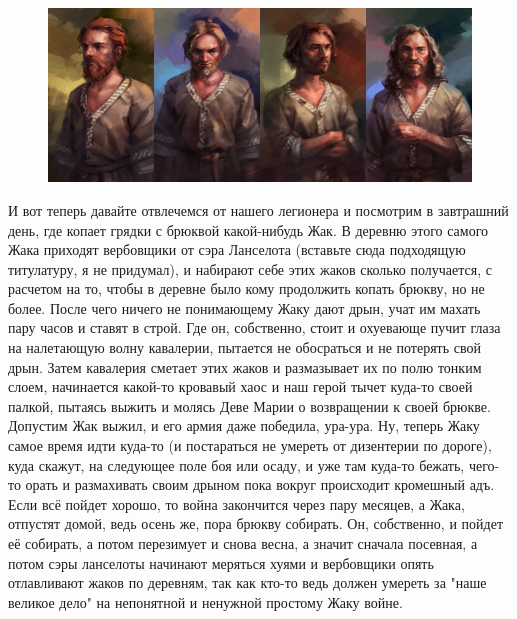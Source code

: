 \begin{figure}[h!tb]
	\centering\includegraphics[scale=0.3]{Legioner/1594658107116371201.png}
	\label{fig:leg2} %
\end{figure}



И вот теперь давайте отвлечемся от нашего легионера и посмотрим в завтрашний день, где копает грядки с брюквой какой-нибудь Жак. В деревню этого самого Жака приходят вербовщики от сэра Ланселота (вставьте сюда подходящую титулатуру, я не придумал), и набирают себе этих жаков сколько получается, с расчетом на то, чтобы в деревне было кому продолжить копать брюкву, но не более. После чего ничего не понимающему Жаку дают дрын, учат им махать пару часов и ставят в строй. Где он, собственно, стоит и охуевающе пучит глаза на налетающую волну кавалерии, пытается не обосраться и не потерять свой дрын. Затем кавалерия сметает этих жаков и размазывает их по полю тонким слоем, начинается какой-то кровавый хаос и наш герой тычет куда-то своей палкой, пытаясь выжить и молясь Деве Марии о возвращении к своей брюкве. Допустим Жак выжил, и его армия даже победила, ура-ура. Ну, теперь Жаку самое время идти куда-то (и постараться не умереть от дизентерии по дороге), куда скажут, на следующее поле боя или осаду, и уже там куда-то бежать, чего-то орать и размахивать своим дрыном пока вокруг происходит кромешный адъ. Если всё пойдет хорошо, то война закончится через пару месяцев, а Жака, отпустят домой, ведь осень же, пора брюкву собирать. Он, собственно, и пойдет её собирать, а потом перезимует и снова весна, а значит сначала посевная, а потом сэры ланселоты начинают меряться хуями и вербовщики опять отлавливают жаков по деревням, так как кто-то ведь должен умереть за "наше великое дело" на непонятной и ненужной простому Жаку войне.


